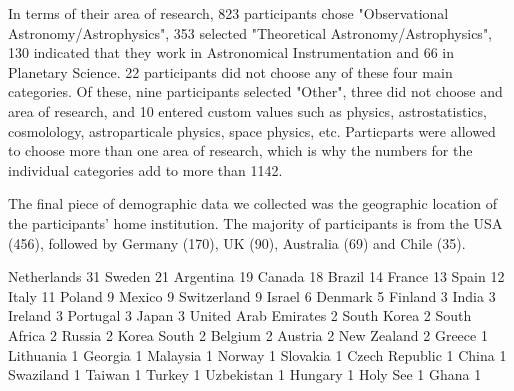 In terms of their area of research, 823 participants chose "Observational Astronomy/Astrophysics", 353 selected "Theoretical Astronomy/Astrophysics", 130 indicated that they work in Astronomical Instrumentation and 66 in Planetary Science. 22 participants did not choose any of these four main categories. Of these, nine participants selected "Other", three did not choose and area of research, and 10 entered custom values such as physics, astrostatistics, cosmolology, astroparticale physics, space physics, etc. Particparts were allowed to choose more than one area of research, which is why the numbers for the individual categories add to more than 1142. 

The final piece of demographic data we collected was the geographic location of the participants' home institution. The majority of participants is from the USA (456), followed by Germany (170), UK (90), Australia (69) and Chile (35). 

             Netherlands     31
                  Sweden     21
               Argentina     19
                  Canada     18
                  Brazil     14
                  France     13
                   Spain     12
                   Italy     11
                  Poland      9
                  Mexico      9
             Switzerland      9
                  Israel      6
                 Denmark      5
                 Finland      3
                   India      3
                 Ireland      3
                Portugal      3
                   Japan      3
    United Arab Emirates      2
             South Korea      2
            South Africa      2
                  Russia      2
             Korea South      2
                 Belgium      2
                 Austria      2
             New Zealand      2
                  Greece      1
               Lithuania      1
                 Georgia      1
                Malaysia      1
                  Norway      1
                Slovakia      1
          Czech Republic      1
                   China      1
               Swaziland      1
                  Taiwan      1
                  Turkey      1
              Uzbekistan      1
                 Hungary      1
                Holy See      1
                   Ghana      1